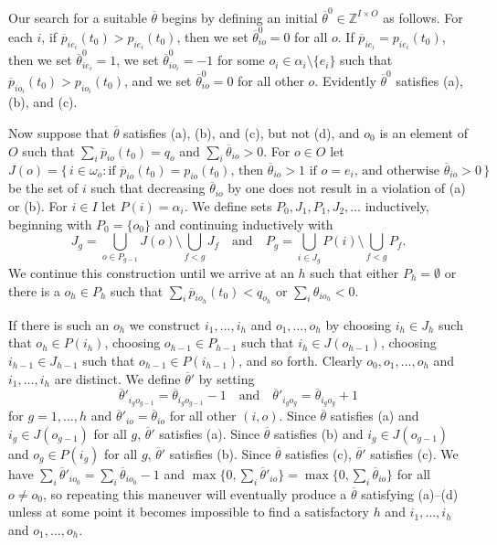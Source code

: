 \documentclass[12pt]{article}
\theoremstyle{definition}
\newcommand{\In}{\mathbb{Z}}
\newcommand{\barp}{\overline{p}}
\newcommand{\bartheta}{{\overline \theta}}
\begin{document}
\begin{appendix}
Our search for a suitable $\bartheta$ begins by defining an initial
$\bartheta^0 \in \In^{I \times O}$ as follows.  For each $i$, if
$\barp_{ie_i}(t_0) > p_{ie_i}(t_0)$, then we set $\bartheta^0_{io} =
0$ for all $o$.  If $\barp_{ie_i} = p_{ie_i}(t_0)$, then we set
$\bartheta^0_{ie_i} = 1$, we set $\bartheta^0_{io_i} = -1$ for some
$o_i \in \alpha_i \setminus \{e_i\}$ such that $\barp_{io_i}(t_0) >
p_{io_i}(t_0)$, and we set $\bartheta^0_{io} = 0$ for all other $o$.
Evidently $\bartheta^0$ satisfies (a), (b), and (c).

Now suppose that $\bartheta$ satisfies (a), (b), and (c), but not (d),
and $o_0$ is an element of $O$ such that $\sum_i \barp_{io}(t_0) =
q_o$ and $\sum_i \bartheta_{io} > 0$.  For $o \in O$ let
$$J(o) = \{\, i \in \omega_o : \text{if $\barp_{io}(t_0) =
  p_{io}(t_0)$, then $\bartheta_{io} > 1$ if $o = e_i$, and otherwise
  $\bartheta_{io} > 0$} \,\}$$ be the set of $i$ such that decreasing
$\bartheta_{io}$ by one does not result in a violation of (a) or (b).
For $i \in I$ let $P(i) = \alpha_i$.  We define sets $P_0, J_1, P_1,
J_2, \ldots$ inductively, beginning with $P_0 = \{o_0\}$ and
continuing inductively with $$J_g = \bigcup_{o \in P_{g-1}} J(o)
\setminus \bigcup_{f < g} J_f \quad \text{and} \quad P_g = \bigcup_{i
  \in J_g} P(i) \setminus \bigcup_{f < g} P_f.$$ We continue this
construction until we arrive at an $h$ such that either $P_h =
\emptyset$ or there is a $o_h \in P_h$ such that $\sum_i
\barp_{io_h}(t_0) < q_{o_h}$ or $\sum_i \theta_{io_h} < 0$.

If there is such an $o_h$ we construct $i_1, \ldots, i_h$ and $o_1,
\ldots, o_h$ by choosing $i_h \in J_h$ such that $o_h \in P(i_h)$,
choosing $o_{h-1} \in P_{h-1}$ such that $i_h \in J(o_{h-1})$,
choosing $i_{h-1} \in J_{h-1}$ such that $o_{h-1} \in P(i_{h-1})$, and
so forth.  Clearly $o_0,o_1, \ldots, o_h$ and $i_1, \ldots, i_h$ are
distinct.  We define $\bartheta'$ by setting $$\bartheta'_{i_go_{g-1}}
= \bartheta_{i_go_{g-1}} - 1 \quad \text{and} \quad
\bartheta'_{i_go_g} = \bartheta_{i_go_g} + 1$$ for $g = 1, \ldots, h$
and $\bartheta'_{io} = \bartheta_{io}$ for all other $(i,o)$.  Since
$\bartheta$ satisfies (a) and $i_g \in J(o_{g-1})$ for all $g$,
$\bartheta'$ satisfies (a).  Since $\bartheta$ satisfies (b) and $i_g
\in J(o_{g-1})$ and $o_g \in P(i_g)$ for all $g$, $\bartheta'$
satisfies (b).  Since $\bartheta$ satisfies (c), $\bartheta'$
satisfies (c).  We have $\sum_i \bartheta'_{io_0} = \sum_i
\bartheta_{io_0} - 1$ and $\max \{0,\sum_i \bartheta'_{io}\} = \max
\{0,\sum_i \bartheta_{io}\}$ for all $o \ne o_0$, so repeating this
maneuver will eventually produce a $\bartheta$ satisfying (a)--(d)
unless at some point it becomes impossible to find a satisfactory $h$
and $i_1, \ldots, i_h$ and $o_1, \ldots, o_h$.


\end{appendix}
\end{document}
